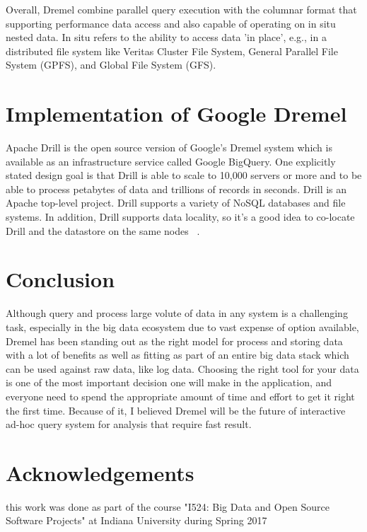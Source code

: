 \documentclass[9pt,twocolumn,twoside]{../../styles/osajnl}
\begin{document}
Overall, Dremel combine parallel query execution with the columnar format that supporting  performance data access and also capable of operating on in situ nested data. In situ refers to the ability to access data 'in place', e.g., in a distributed file system like Veritas Cluster File System,  General Parallel File System (GPFS), and  Global File System (GFS). 

\section{Implementation of Google Dremel }
Apache Drill is the open source version of Google's Dremel system which is available as an infrastructure service called Google BigQuery. One explicitly stated design goal is that Drill is able to scale to 10,000 servers or more and to be able to process petabytes of data and trillions of records in seconds. Drill is an Apache top-level project.  Drill supports a variety of NoSQL databases and file systems. In addition, Drill supports data locality, so it's a good idea to co-locate Drill and the datastore on the same nodes ~\cite{wiki-drill}.

\section{Conclusion}
 Although query and process large volute of data in any system is a challenging task, especially in the big data ecosystem due to vast expense of option available, Dremel has been standing out as the right model for process and storing data with a lot of benefits as well as fitting as part of an entire big data stack which can be used against raw data, like log data.  Choosing the right tool for your data is one of the most important decision one will make in the application, and everyone need to spend the appropriate amount of time and effort to get it right the first time. Because of it,  I believed Dremel will be the future of interactive ad-hoc query system for analysis that require fast result. 
 
 \section{Acknowledgements}
this work was done as part of the course "I524: Big Data and Open Source Software Projects" at Indiana University during Spring 2017




 
\end{document}
